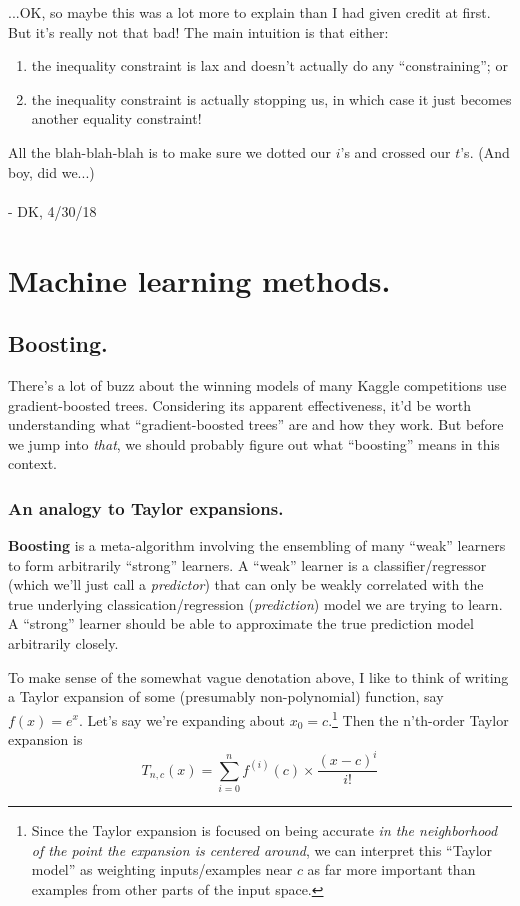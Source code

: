 \documentclass[letterpaper,12pt]{report}
\providecommand{\tightlist}{%
  \setlength{\itemsep}{0pt}\setlength{\parskip}{0pt}}
\begin{document}
...OK, so maybe this was a lot more to explain than I had given credit
at first. But it's really not that bad! The main intuition is that either:
\begin{enumerate}
  \tightlist
  \item
    the inequality constraint is lax and doesn't actually do any
``constraining''; or 
  \item 
    the inequality constraint is actually stopping us,
    in which case it just becomes another equality constraint!
\end{enumerate}
All the blah-blah-blah is to make sure we dotted our \(i\)'s and crossed
our \(t\)'s. (And boy, did we...)
\\
\\
- DK, 4/30/18

\newpage


\chapter{Machine learning methods.}\label{machine-learning-methods}



\section{Boosting.}\label{boosting}

There's a lot of buzz about the winning models of many Kaggle competitions 
use gradient-boosted trees. Considering its apparent effectiveness, it'd be worth understanding
what ``gradient-boosted trees'' are and how they work. But before we jump into \emph{that}, 
we should probably figure out what ``boosting'' means in this context.

\subsection{An analogy to Taylor expansions.}


\textbf{Boosting} is a meta-algorithm involving
the ensembling of many ``weak'' learners to form arbitrarily ``strong'' learners.
A ``weak'' learner is a classifier/regressor (which we'll just call a \emph{predictor}) 
that can only be weakly correlated with the true underlying 
classication/regression (\emph{prediction}) model we are trying to 
learn. A ``strong'' learner should be able to approximate the true prediction model
arbitrarily closely.

To make sense of the somewhat vague denotation above, 
I like to think of writing a Taylor expansion of some (presumably non-polynomial)
function, say \(f(x) = e^x\). Let's say we're expanding about \(x_0 = c\).\footnote{
  Since the Taylor expansion is focused on being accurate
  \emph{in the neighborhood of the point the expansion is centered around}, 
  we can interpret this ``Taylor model'' as weighting inputs/examples near \(c\) 
  as far more important than examples from other parts of the input space.
} 
Then the n'th-order Taylor expansion is
\[ T_{n,c}(x) = \sum_{i=0}^{n} f^{(i)}(c) \times \frac{(x-c)^i}{i!}\]
\end{document}
